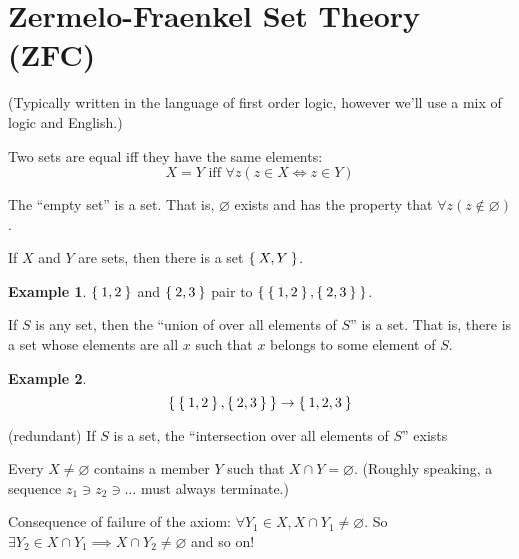 \documentclass[12pt]{amsart}
\theoremstyle{plain}
\theoremstyle{remark}
\theoremstyle{definition}
\newtheorem*{eg}{Example}
\begin{document}
\section*{Zermelo-Fraenkel Set Theory (ZFC)} 
(Typically written in the language of first order logic, however we'll use a mix of logic and English.)

\begin{AXM}
	Two sets are equal iff they have the same elements:
\begin{equation*}
	X = Y \text{ iff } \forall z(z\in X \iff z\in Y) 
\end{equation*}
\end{AXM}

\begin{AXM}
	The ``empty set'' is a set. That is, $\varnothing$ exists and has the property that $\forall z(z \notin \varnothing)$.
\end{AXM}

\begin{AXM}
	If $X$ and $Y$ are sets, then there is a set $\Set{X, Y}$.
	\begin{eg}
		$\Set{1, 2}$ and $\Set{2, 3}$ pair to $\Set{\Set{1,2}, \Set{2,3}}$.
	\end{eg}
\end{AXM}

\begin{AXM}
	If $S$ is any set, then the ``union of over all elements of $S$'' is a set. That is, there is a set whose elements are all $x$ such that $x$ belongs to some element of $S$.
	\begin{eg}
	\begin{equation*}
		\Set{\Set{1,2},\Set{2,3}} \rightarrow \Set{1,2,3}
	\end{equation*}
	\end{eg}
\end{AXM}

\begin{AXM}(redundant)
	If $S$ is a set, the ``intersection over all elements of $S$'' exists
\end{AXM}

\begin{AXM}
	Every $X \neq \varnothing$ contains a member $Y$ such that $X \cap Y = \varnothing$.
	(Roughly speaking, a sequence $z_1 \ni z_2 \ni \dots$ must always terminate.)
\end{AXM}
Consequence of failure of the axiom:
\newline
$\forall Y_1 \in X, X \cap Y_1 \neq \varnothing$. So $\exists Y_2\in X \cap Y_1 \implies X \cap Y_2 \neq \varnothing$ and so on!
\end{document}
